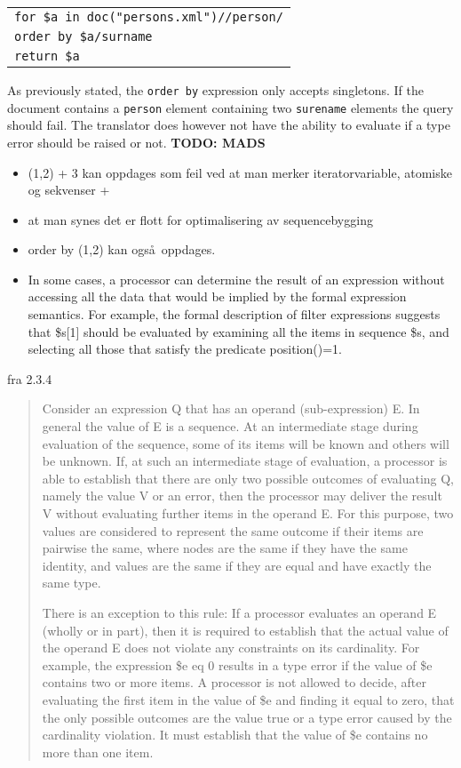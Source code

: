 \begin{center}
\begin{tabular}{l}
\texttt{for \$a in doc("persons.xml")//person/} \\
\texttt{order by \$a/surname} \\
\texttt{return \$a}
\end{tabular}
\end{center}

As previously stated, the \texttt{order by} expression only accepts singletons. If the document contains a
\texttt{person} element containing two \texttt{surename} elements the query should fail. The translator does
however not have the ability to evaluate if a type error should be raised or not.
\textbf{\LARGE TODO: {MADS}}
\begin{itemize}
   \item (1,2) + 3 kan oppdages som feil ved at man merker iteratorvariable, atomiske og sekvenser + 
   \item at man synes det er flott for optimalisering av sequencebygging 
   \item order by (1,2) kan ogs\aa~oppdages. 
   \item In some cases, a processor can determine the result of an expression without accessing all the data that
   would be implied by the formal expression semantics. For example, the formal description of filter expressions
   suggests that \$s[1] should be evaluated by examining all the items in sequence \$s, and selecting all those
   that satisfy the predicate position()=1.
\end{itemize}

fra 2.3.4 \cite{w3c00}
\begin{quote}
Consider an expression Q that has an operand (sub-expression) E. In general the value of E is a sequence. At an
intermediate stage during evaluation of the sequence, some of its items will be known and others will be unknown.
If, at such an intermediate stage of evaluation, a processor is able to establish that there are only two possible
outcomes of evaluating Q, namely the value V or an error, then the processor may deliver the result V without
evaluating further items in the operand E. For this purpose, two values are considered to represent the same
outcome if their items are pairwise the same, where nodes are the same if they have the same identity, and values
are the same if they are equal and have exactly the same type.

There is an exception to this rule: If a processor evaluates an operand E (wholly or in part), then it is required
to establish that the actual value of the operand E does not violate any constraints on its cardinality. For
example, the expression \$e eq 0 results in a type error if the value of \$e contains two or more items. A processor
is not allowed to decide, after evaluating the first item in the value of \$e and finding it equal to zero, that the
only possible outcomes are the value true or a type error caused by the cardinality violation. It must establish
that the value of \$e contains no more than one item.
\end{quote}

